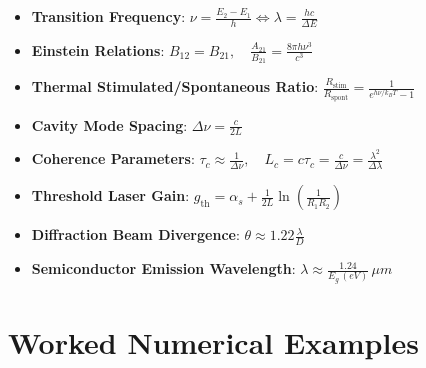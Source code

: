 \begin{quickrevision}
\begin{itemize}
    \item \textbf{Transition Frequency}: $\nu = \frac{E_2 - E_1}{h} \iff \lambda = \frac{hc}{\Delta E}$
    \item \textbf{Einstein Relations}: $B_{12} = B_{21}, \quad \frac{A_{21}}{B_{21}} = \frac{8\pi h \nu^3}{c^3}$
    \item \textbf{Thermal Stimulated/Spontaneous Ratio}: $\frac{R_{\text{stim}}}{R_{\text{spont}}} = \frac{1}{e^{h\nu/k_B T} - 1}$
    \item \textbf{Cavity Mode Spacing}: $\Delta \nu = \frac{c}{2L}$
    \item \textbf{Coherence Parameters}: $\tau_c \approx \frac{1}{\Delta \nu}, \quad L_c = c \tau_c = \frac{c}{\Delta \nu} = \frac{\lambda^2}{\Delta \lambda}$
    \item \textbf{Threshold Laser Gain}: $g_{\text{th}} = \alpha_s + \frac{1}{2L} \ln\left( \frac{1}{R_1 R_2} \right)$
    \item \textbf{Diffraction Beam Divergence}: $\theta \approx 1.22 \frac{\lambda}{D}$
    \item \textbf{Semiconductor Emission Wavelength}: $\lambda \approx \frac{1.24}{E_g\,(\si{eV})}\,\si{\mu m}$
\end{itemize}
\end{quickrevision}

\section{Worked Numerical Examples}

